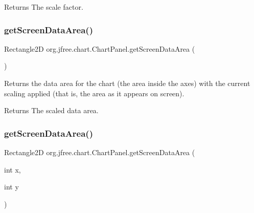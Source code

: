 \begin{DoxyReturn}{Returns}
The scale factor. 
\end{DoxyReturn}
\mbox{\label{classorg_1_1jfree_1_1chart_1_1_chart_panel_adf48c288fcd8f61ea66193ab08b7a95d}} 
\subsubsection{\texorpdfstring{get\+Screen\+Data\+Area()}{getScreenDataArea()}\hspace{0.1cm}{\footnotesize\ttfamily [1/2]}}
{\footnotesize\ttfamily Rectangle2D org.\+jfree.\+chart.\+Chart\+Panel.\+get\+Screen\+Data\+Area (\begin{DoxyParamCaption}{ }\end{DoxyParamCaption})}

Returns the data area for the chart (the area inside the axes) with the current scaling applied (that is, the area as it appears on screen).

\begin{DoxyReturn}{Returns}
The scaled data area. 
\end{DoxyReturn}
\mbox{\label{classorg_1_1jfree_1_1chart_1_1_chart_panel_ad89851837dc081fbdc260e62b6543528}} 
\subsubsection{\texorpdfstring{get\+Screen\+Data\+Area()}{getScreenDataArea()}\hspace{0.1cm}{\footnotesize\ttfamily [2/2]}}
{\footnotesize\ttfamily Rectangle2D org.\+jfree.\+chart.\+Chart\+Panel.\+get\+Screen\+Data\+Area (\begin{DoxyParamCaption}\item[{int}]{x,  }\item[{int}]{y }\end{DoxyParamCaption})}

